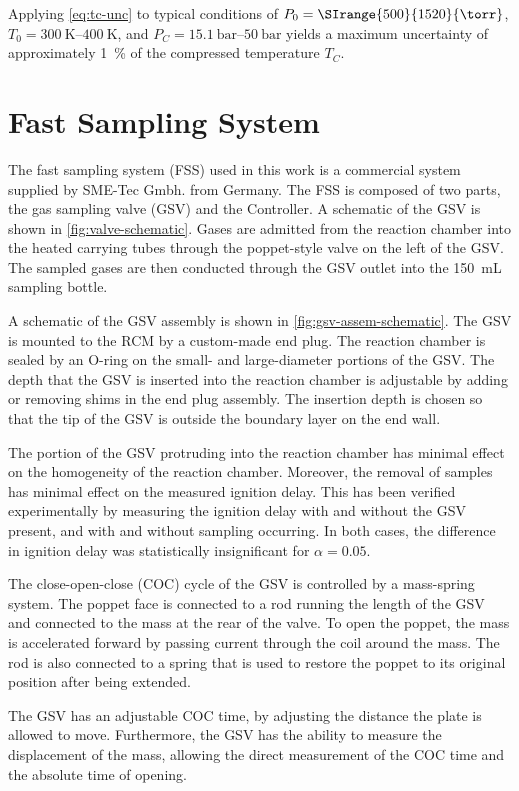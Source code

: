 \documentclass[../main.tex]{subfiles}
\begin{document}
Applying \cref{eq:tc-unc} to typical conditions of $P_0 = \SIrange{500}{1520}{\torr}$,
$T_0=\SIrange{300}{400}{\kelvin}$, and $P_C=\SIrange{15.1}{50}{\bar}$ yields
a maximum uncertainty of approximately \SI{1}{\percent} of the
compressed temperature $T_C$.

\section{Fast Sampling System}
\label{sec:fast-sampling}

The fast sampling system (FSS) used in this work is a commercial system supplied by
SME-Tec Gmbh. from Germany. The FSS is composed of two parts, the gas sampling valve
(GSV) and the Controller. A schematic of the GSV is shown in \cref{fig:valve-schematic}.
Gases are admitted from the reaction chamber into the heated carrying tubes
through the poppet-style valve on the left of the GSV. The sampled gases are then
conducted through the GSV outlet into the \SI{150}{\milli\liter} sampling bottle.

A schematic of the GSV assembly is shown in \cref{fig:gsv-assem-schematic}.
The GSV is mounted to the RCM by a custom-made end plug. The reaction chamber
is sealed by an O-ring on the small- and large-diameter portions of the GSV.
The depth that the GSV is inserted into the reaction chamber is adjustable
by adding or removing shims in the end plug assembly. The insertion depth
is chosen so that the tip of the GSV is outside the boundary layer on the
end wall.

The portion of the GSV protruding into the reaction chamber has minimal
effect on the homogeneity of the reaction chamber. Moreover, the removal of
samples has minimal effect on the measured ignition delay.
This has been verified experimentally by measuring the ignition delay with
and without the GSV present, and with and without sampling occurring.
In both cases, the difference in ignition delay was statistically insignificant
for $\alpha=0.05$.

The close-open-close (COC) cycle of the GSV is controlled by a mass-spring
system. The poppet face is connected to a rod running the length of the
GSV and connected to the mass at the rear of the valve. To open the poppet,
the mass is accelerated forward by passing current through the coil around
the mass. The rod is also
connected to a spring that is used to restore the poppet to its original
position after being extended.

The GSV has an adjustable COC time, by adjusting the
distance the plate is allowed to move. Furthermore, the GSV has the ability
to measure the displacement of the mass, allowing the direct measurement of
the COC time and the absolute time of opening.
\end{document}
